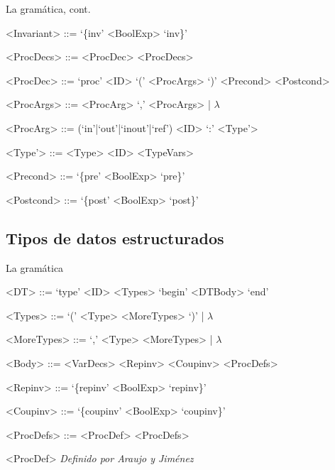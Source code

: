 \documentclass{beamer}
\begin{document}
\begin{frame}{La gramática, cont.}
\scriptsize
\begin{grammar}

<Invariant> ::= `\{inv' <BoolExp> `inv\}'

<ProcDecs> ::= <ProcDec> <ProcDecs>

<ProcDec> ::= `proc' <ID> `(' <ProcArgs> `)' <Precond> <Postcond>

<ProcArgs> ::= <ProcArg> `,' <ProcArgs> | $\lambda$

<ProcArg> ::= (`in'|`out'|`inout'|`ref') <ID> `:' <Type'>

<Type'> ::= <Type>
\alt <ID> <TypeVars>

<Precond> ::= `\{pre' <BoolExp> `pre\}'

<Postcond> ::= `\{post' <BoolExp> `post\}'

\end{grammar}
\end{frame}

\subsection{Tipos de datos estructurados}
\begin{frame}{La gramática}
\scriptsize
\begin{grammar}

<DT> ::= `type' <ID> <Types> `begin' <DTBody> `end'

<Types> ::= `(' <Type> <MoreTypes> `)' | $\lambda$

<MoreTypes> ::= `,' <Type> <MoreTypes> | $\lambda$

<Body> ::= <VarDecs> <Repinv> <Coupinv> <ProcDefs>

<Repinv> ::= `\{repinv' <BoolExp> `repinv\}'

<Coupinv> ::= `\{coupinv' <BoolExp> `coupinv\}'

<ProcDefs> ::= <ProcDef> <ProcDefs>

<ProcDef> \textit{Definido por Araujo y Jiménez}

\end{grammar}
\end{frame}
\end{document}
